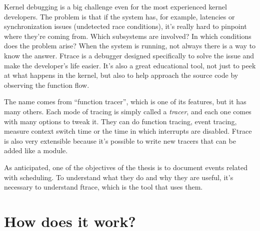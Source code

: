 \documentclass[10pt]{book}
\begin{document}
Kernel debugging is a big challenge even for the most experienced kernel developers. The problem is that if the system has, for example, latencies or synchronization issues (undetected race conditions), it's really hard to pinpoint where they're coming from. Which subsystems are involved? In which conditions does the problem arise? When the system is running, not always there is a way to know the answer. Ftrace is a debugger designed specifically to solve the issue and make the developer's life easier. It's also a great educational tool, not just to peek at what happens in the kernel, but also to help approach the source code by observing the function flow.

The name comes from ``function tracer'', which is one of its features, but it has many others. Each mode of tracing is simply called a \textit{tracer}, and each one comes with many options to tweak it. They can do function tracing, event tracing, measure context switch time or the time in which interrupts are disabled. Ftrace is also very extensible because it's possible to write new tracers that can be added like a module.

As anticipated, one of the objectives of the thesis is to document events related with scheduling. To understand what they do and why they are useful, it's necessary to understand ftrace, which is the tool that uses them.
\section{How does it work?}
\end{document}
